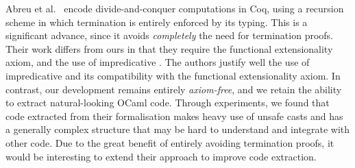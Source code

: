 \documentclass[a4paper,anonymous, UKenglish,cleveref, autoref, thm-restate]{lipics-v2021}
\newcommand{\mvol}[1]{\textcolor{blue}{\textsc{Michael}: #1}}
\begin{document}
Abreu et al.~\cite{AbreuDHJMS23} encode divide-and-conquer computations in Coq,
using a recursion scheme in which termination is entirely enforced by its
typing. This is a significant advance, since it avoids \emph{completely} the
need for termination proofs. Their work differs from ours in that they require
the functional extensionality axiom, and the use of impredicative . The
authors justify well the use of impredicative  and its compatibility
with the functional extensionality axiom. In contrast, our development remains
entirely \emph{axiom-free}, and we retain the ability to extract natural-looking
OCaml code.
Through experiments, we found that code extracted from their formalisation makes
heavy use of unsafe casts and has a generally complex structure that may be
hard to understand and integrate with other code. Due to the great benefit
of entirely avoiding termination proofs, it would be interesting to extend their
approach to improve code extraction.
\end{document}
